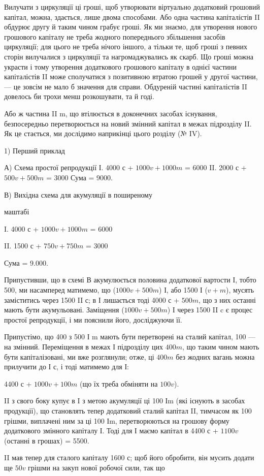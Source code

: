 Вилучати з циркуляції ці гроші, щоб утворювати віртуально додатковий
грошовий капітал, можна, здається, лише двома способами. Або
одна частина капіталістів II обдурює другу й таким чином грабує гроші.
Як ми знаємо, для утворення нового грошового капіталу не треба жодного
попереднього збільшення засобів циркуляції; для цього не треба
нічого іншого, а тільки те, щоб гроші з певних сторін вилучалися з
циркуляції та нагромаджувались як скарб. Що гроші можна украсти і
тому утворення додаткового грошового капіталу в однієї частини капіталістів
II може сполучатися з позитивною втратою грошей у другої частини,
— це зовсім не мало б значення для справи. Обдуреній частині
капіталістів II довелось би трохи менш розкошувати, та й годі.

Або ж частина II m, що втілюється в доконечних засобах існування,
безпосередньо перетворюється на новий змінний капітал в межах підрозділу
II. Як це стається, ми дослідимо наприкінці цього розділу
(№ IV).

1) Перший приклад

А) Схема простої репродукції
І. 4000 с + $1000 v + 1000 m$ = 6000
II. 2000 с + $500 v + 500 m$ = 3000
Сума = 9000.

В) Вихідна схема для акумуляції в поширеному

маштабі

I. 4000 с + $1000 v + 1000 m$ = 6000

II. 1500 с + $750 v + 750 m$ = 3000

Сума = 9.000.

Припустивши, що в схемі В акумулюється половина додаткової вартости
І, тобто 500, ми насамперед матимемо, що ($1000 v + 500 m$) І,
або 1500 І ($v + m$), мусять заміститись через 1500 II с; в І лишається
тоді 4000 с + $500 m$, що з них останні мають бути акумульовані.
Заміщення ($1000 v + 500 m$) І через 1500 II c є процес простої репродукції,
і ми пояснили його, досліджуючи її.

Припустімо, що 400 з 500 І m мають бути перетворені на сталий
капітал, 100 — на змінний. Переміщення в межах І підрозділу цих $400 m$,
що таким чином мають бути капіталізовані, ми вже розглянули; отже,
ці $400 m$ без жодних вагань можна прилучити до І с, і тоді матимемо
для І:

4400 с + $1000 v + 100 m$ (що їх треба обміняти на $100 v$).

II з свого боку купує в I з метою акумуляції ці 100 Іm (які існують
в засобах продукції), що становлять тепер додатковий сталий капітал II,
тимчасом як 100 грішми, виплачені ним за ці 100 Іm, перетворюються
на грошову форму додаткового змінного капіталу І. Тоді для І маємо
капітал в 4400 с + $1100 v$ (останні в грошах) = 5500.

II мав тепер для сталого капіталу 1600 с; щоб його обробити, він
мусить додати ще $50 v$ грішми на закуп нової робочої сили, так що
\parbreak{}  %
